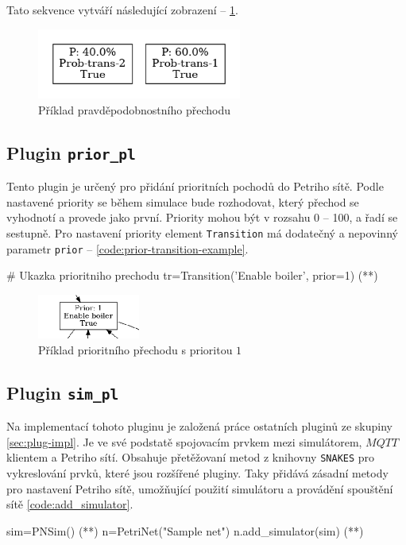 Tato sekvence vytváří následující zobrazení -- \ref{prob-transition}.

\begin{figure}[hbt]
 \centering
 \includegraphics[width=0.6\textwidth]{obrazky-figures/prob-transition.png}
 \caption{Příklad pravděpodobnostního přechodu}
 \label{prob-transition}
\end{figure}

\subsection{Plugin \texttt{prior\_pl}}
\label{subsec:prior_pl}
Tento plugin je určený pro přidání prioritních pochodů do Petriho sítě. Podle nastavené priority se během simulace bude rozhodovat, který přechod se vyhodnotí a provede jako první. Priority mohou být v rozsahu 0 -- 100, a řadí se sestupně. Pro nastavení priority element \texttt{Transition} má dodatečný a nepovinný parametr \texttt{prior} -- \ref{code:prior-transition-example}.
\begin{python}
 # Ukazka prioritniho prechodu
 tr=Transition('Enable boiler', prior=1) (*\label{code:prior-transition-example}*)
\end{python}

\begin{figure}[hbt]
 \centering
 \includegraphics[width=0.3\textwidth]{obrazky-figures/prior-transition.png}
 \caption{Příklad prioritního přechodu s prioritou $1$}
 \label{prior-transition}
\end{figure}

\subsection{Plugin \texttt{sim\_pl}}
\label{subsec:sim_pl}
Na implementací tohoto pluginu je založená práce ostatních pluginů ze skupiny \ref{sec:plug-impl}. Je ve své podstatě spojovacím prvkem mezi simulátorem, $MQTT$ klientem a Petriho sítí. Obsahuje přetěžovaní metod z knihovny \texttt{SNAKES} pro vykreslování prvků, které jsou rozšířené pluginy. Taky přidává zásadní metody pro nastavení Petriho sítě, umožňující použití simulátoru a provádění spouštění sítě \ref{code:add_simulator}.
\begin{python}
 sim=PNSim() (*\label{code:sim-add}*)
 n=PetriNet("Sample net")
 n.add_simulator(sim) (*\label{code:add_simulator}*)
\end{python}

